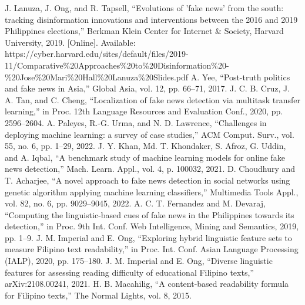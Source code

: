 \documentclass[conference]{IEEEtran}
\begin{document}
\begin{thebibliography}{00}
 J. Lanuza, J. Ong, and R. Tapsell, ``Evolutions of 'fake news' from the south: tracking disinformation innovations and interventions between the 2016 and 2019 Philippines elections,'' Berkman Klein Center for Internet \& Society, Harvard University, 2019. [Online]. Available: https://cyber.harvard.edu/sites/default/files/2019-11/Comparative\%20Approaches\%20to\%20Disinformation\%20-\%20Jose\%20Mari\%20Hall\%20Lanuza\%20Slides.pdf
 A. Yee, ``Post-truth politics and fake news in Asia,'' Global Asia, vol. 12, pp. 66--71, 2017.
 J. C. B. Cruz, J. A. Tan, and C. Cheng, ``Localization of fake news detection via multitask transfer learning,'' in Proc. 12th Language Resources and Evaluation Conf., 2020, pp. 2596--2604.
 A. Paleyes, R.-G. Urma, and N. D. Lawrence, ``Challenges in deploying machine learning: a survey of case studies,'' ACM Comput. Surv., vol. 55, no. 6, pp. 1--29, 2022.
 J. Y. Khan, Md. T. Khondaker, S. Afroz, G. Uddin, and A. Iqbal, ``A benchmark study of machine learning models for online fake news detection,'' Mach. Learn. Appl., vol. 4, p. 100032, 2021.
 D. Choudhury and T. Acharjee, ``A novel approach to fake news detection in social networks using genetic algorithm applying machine learning classifiers,'' Multimedia Tools Appl., vol. 82, no. 6, pp. 9029--9045, 2022.
 A. C. T. Fernandez and M. Devaraj, ``Computing the linguistic-based cues of fake news in the Philippines towards its detection,'' in Proc. 9th Int. Conf. Web Intelligence, Mining and Semantics, 2019, pp. 1--9.
 J. M. Imperial and E. Ong, ``Exploring hybrid linguistic feature sets to measure Filipino text readability,'' in Proc. Int. Conf. Asian Language Processing (IALP), 2020, pp. 175--180.
 J. M. Imperial and E. Ong, ``Diverse linguistic features for assessing reading difficulty of educational Filipino texts,'' arXiv:2108.00241, 2021.
 H. B. Macahilig, ``A content-based readability formula for Filipino texts,'' The Normal Lights, vol. 8, 2015.
\end{thebibliography}
\end{document}
